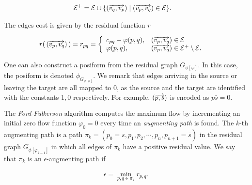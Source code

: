 \begin{align*}
	\mathcal{E}^+ &= \mathcal{E} \cup \{ ( \overrightarrow{ v_q,v_p} ) \; | \; ( \overrightarrow{ v_p,v_q} ) \in \mathcal{E} \}.
\end{align*}

The edges cost is given by the residual function $r$

\begin{align*}
	r(\, ( \overrightarrow{ v_p,v_q} ) \, ) = r_{pq} &= \left\{ \begin{array}{ll}
	c_{pq} - \varphi( p,q ), & ( \overrightarrow{ v_p,v_q} ) \in \mathcal{E}\\
	\varphi( p,q ), & ( \overrightarrow{ v_p,v_q} ) \in \mathcal{E}^+ \setminus \mathcal{E}.
\end{array}\right.	 
\end{align*}

One can also construct a posiform from the residual graph $G_{ \phi [ \varphi ] }$. In this case, the posiform is denoted $\phi_{G_{ \phi [ \varphi ] }}$. We remark that edges arriving in the source or leaving the target are all mapped to $0$, as the source and the target are identified with the constants $1,0$ respectively. For example, $( \overrightarrow{ p,s} )$ is encoded as $p\bar{s}=0$.

The \emph{Ford-Fulkerson} algorithm computes the maximum flow by incrementing an initial zero flow function $\varphi_0=0$ every time an \emph{augmenting path} is found. The $k$-th augmenting path is a path $\pi_k = (p_0=s,p_1,p_2,\cdots,p_n,p_{n+1}=\bar{s})$ in the residual graph $G_{ \phi [\varphi_{k-1}] }$ in which all edges of $\pi_k$ have a positive residual value. We say that $\pi_k$ is an $\epsilon$-augmenting path if 

\begin{align*}
	\epsilon = \min_{p,q \in \pi_k} r_{p,q}.
\end{align*}


